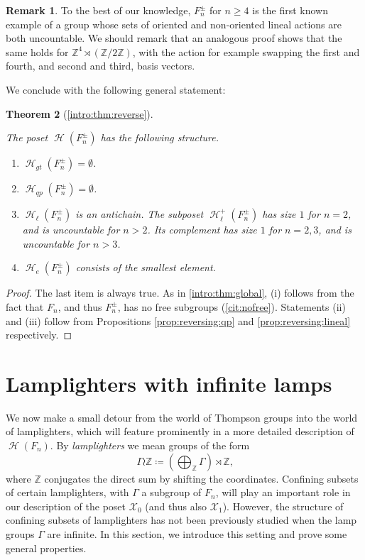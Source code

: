 \documentclass[reqno,12pt]{amsart}\setcounter{tocdepth}{1}
\newtheorem{theorem}{Theorem}[section]
\theoremstyle{definition}
\newtheorem{remark}[theorem]{Remark}
\newcommand{\Z}{\mathbb{Z}}
\DeclareMathOperator{\Hyp}{\mathcal{H}}
\newcommand{\X}{\mathcal{X}}
\numberwithin{equation}{section}
\begin{document}
\begin{remark}
To the best of our knowledge, $F_n^\pm$ for $n\ge 4$ is the first known example of a group whose sets of oriented and non-oriented lineal actions are both uncountable. We should remark that an analogous proof shows that the same holds for $\Z^4 \rtimes (\Z/2\Z)$, with the action for example swapping the first and fourth, and second and third, basis vectors.
\end{remark}

We conclude with the following general statement:

\begin{theorem}[\cref{intro:thm:reverse}]\label{thm:reverse}

The poset $\Hyp(F_n^{\pm})$ has the following structure.
\begin{enumerate}
   \item $\Hyp_{gt}(F_n^{\pm}) = \emptyset$.
   \item $\Hyp_{qp}(F_n^{\pm}) = \emptyset$.
   \item $\Hyp_{\ell}(F_n^{\pm})$ is an antichain. The subposet $\Hyp_{\ell}^+(F_n^{\pm})$ has size $1$ for $n = 2$, and is uncountable for $n > 2$. Its complement has size $1$ for $n = 2,3$, and is uncountable for $n > 3$.
   \item $\Hyp_e(F_n^{\pm})$ consists of the smallest element.
\end{enumerate}
\end{theorem}

\begin{proof}
The last item is always true. As in \cref{intro:thm:global}, (i) follows from the fact that $F_n$, and thus $F_n^{\pm}$, has no free subgroups (\cref{cit:nofree}). Statements (ii) and (iii) follow from Propositions \ref{prop:reversing:qp} and \ref{prop:reversing:lineal} respectively.
\end{proof}


\section{Lamplighters with infinite lamps}\label{sec:lamplighters}

We now make a small detour from the world of Thompson groups into the world of lamplighters, which will feature prominently in a more detailed description of $\Hyp(F_n)$. By \emph{lamplighters} we mean groups of the form
\[
\Gamma \wr \Z \coloneqq \left( \bigoplus_{\Z} \Gamma \right) \rtimes \Z \text{,}
\]
where $\Z$ conjugates the direct sum by shifting the coordinates. Confining subsets of certain lamplighters, with $\Gamma$ a subgroup of $F_n$, will play an important role in our description of the poset $\X_0$ (and thus also $\X_1$). However, the structure of confining subsets of lamplighters has not been previously studied when the lamp groups $\Gamma$ are infinite. In this section, we introduce this setting and prove some general properties.
\end{document}
